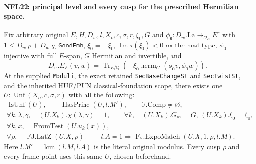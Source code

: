 \paragraph{NFL22: principal level and every cusp for the prescribed Hermitian space.}
\label{claim:NFL22}
Fix arbitrary original $E,H,D_w,l,X_o,c,\sigma,r,\xi_0,G$ and
$\phi_0:D_w.\mathrm{La}\to_{\mathcal O_E}E^r$ with
$1\le D_w.p+D_w.q$, \texttt{GoodEmb}, $\bar\xi_0=-\xi_0$,
$\operatorname{Im}\tau(\xi_0)<0$ on the host type,
$\phi_0$ injective with full $E$-span, $G$ Hermitian and invertible,
and
\[
 D_w.E_F(v,w)=\operatorname{Tr}_{E/\mathbb Q}
       (-\xi_0\operatorname{herm}_G(\phi_0v,\phi_0w)).
\]
At the supplied \texttt{Moduli}, the exact retained
\texttt{SecBaseChangeSt} and \texttt{SecTwistSt}, and the
inherited HUF/PUN classical-foundation scope, there exists one
$U:\operatorname{Unf}(X_o,c,\sigma,r)$ with all the following:
\[
 \begin{gathered}
 \operatorname{IsUnf}(U),\qquad
 \operatorname{HasPrinc}(U,l.M'),\qquad U.\mathrm{Comp}\ne\varnothing,\\
 \forall k,\lambda,\gamma,\quad (U.X_k).\chi(\lambda,\gamma)=1,\qquad
 \forall k,\quad (U.X_k).G_m=G,\ (U.X_k).\xi_0=\xi_0,\\
 \forall k,x,\quad\operatorname{FromTest}(U.u_k(x)),\\
 \forall\rho,\quad\operatorname{FJ.LatZ}(U.X,\rho),\qquad
 l.A=1\Longrightarrow\operatorname{FJ.ExpoMatch}(U.X,1,\rho,l.M).
 \end{gathered}
 \tag{NFL.29}
\]
Here $l.M'=\operatorname{lcm}(l.M,l.A)$ is the literal original
modulus.  Every cusp $\rho$ and every frame point uses this
same $U$, chosen beforehand.

